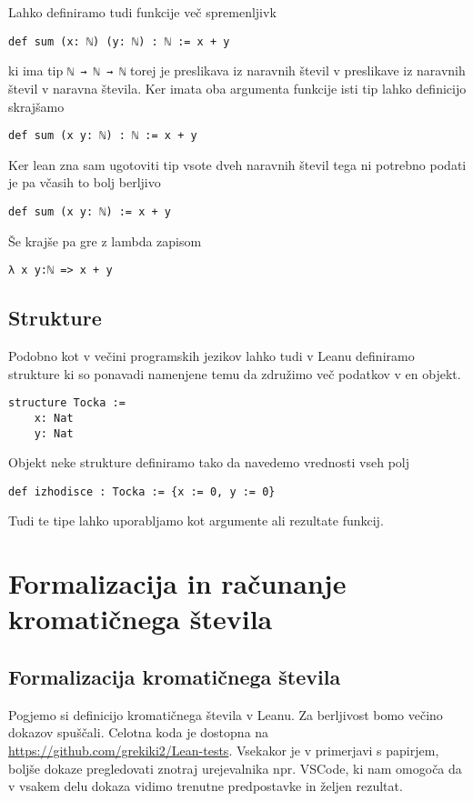 \documentclass[mat1]{fmfdelo}
\begin{document}
Lahko definiramo tudi funkcije več spremenljivk
\begin{lstlisting}
def sum (x: ℕ) (y: ℕ) : ℕ := x + y
\end{lstlisting}
ki ima tip \lstinline{ℕ → ℕ → ℕ} torej je preslikava iz naravnih števil v preslikave iz naravnih števil v naravna števila.
Ker imata oba argumenta funkcije isti tip lahko definicijo skrajšamo
\begin{lstlisting}
def sum (x y: ℕ) : ℕ := x + y
\end{lstlisting}
Ker lean zna sam ugotoviti tip vsote dveh naravnih števil tega ni potrebno podati je pa včasih to bolj berljivo
\begin{lstlisting}
def sum (x y: ℕ) := x + y
\end{lstlisting}
Še krajše pa gre z lambda zapisom
\begin{lstlisting}
λ x y:ℕ => x + y
\end{lstlisting}

\subsection{Strukture}
Podobno kot v večini programskih jezikov lahko tudi v Leanu definiramo strukture ki so ponavadi namenjene temu da združimo več podatkov v en objekt.
\begin{lstlisting}
structure Tocka :=
    x: Nat
    y: Nat
\end{lstlisting}
Objekt neke strukture definiramo tako da navedemo vrednosti vseh polj
\begin{lstlisting}
def izhodisce : Tocka := {x := 0, y := 0}
\end{lstlisting}
Tudi te tipe lahko uporabljamo kot argumente ali rezultate funkcij.




\section{Formalizacija in računanje kromatičnega števila}
\subsection{Formalizacija kromatičnega števila}
Pogjemo si definicijo kromatičnega števila v Leanu.
Za berljivost bomo večino dokazov spuščali.
Celotna koda je dostopna na \url{https://github.com/grekiki2/Lean-tests}.
Vsekakor je v primerjavi s papirjem, boljše dokaze pregledovati znotraj urejevalnika npr. VSCode, ki nam omogoča da v vsakem delu dokaza vidimo 
trenutne predpostavke in željen rezultat. 
\end{document}
